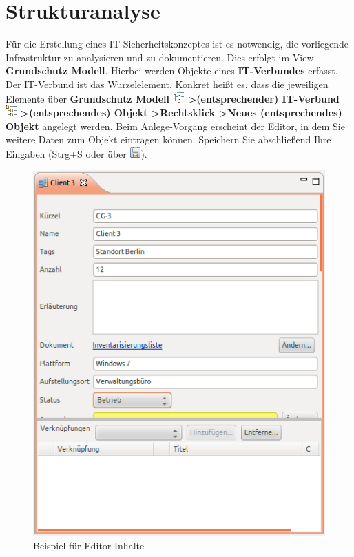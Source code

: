 \documentclass[a4paper,10pt]{book}
\begin{document}
\section{Strukturanalyse} \label{Strukturanalyse}
Für die Erstellung eines IT-Sicherheitskonzeptes ist es notwendig, die vorliegende Infrastruktur zu analysieren und zu dokumentieren. Dies erfolgt im View \textbf{Grundschutz Modell}. Hierbei werden Objekte eines \textbf{IT-Verbundes} erfasst. Der IT-Verbund ist das Wurzelelement. Konkret heißt es, dass die jeweiligen Elemente über \textbf{Grundschutz Modell \includegraphics[height=2ex]{Icon/GS_Modell.png} \textgreater (entsprechender) IT-Verbund \includegraphics[height=2ex]{Icon/GS_Modell.png} \textgreater (entsprechendes) Objekt \textgreater Rechtsklick \textgreater Neues (entsprechendes) Objekt} angelegt werden. Beim Anlege-Vorgang erscheint der Editor, in dem Sie weitere Daten zum Objekt eintragen können. Speichern Sie abschließend Ihre Eingaben (Strg+S oder über \includegraphics[height=2ex]{Icon/Disk.png}).
\newline
\begin{figure}[htb!]
  \centering
  \includegraphics[scale=.65]{Screenshot/Editor-View_GS.png}
  \caption{\label{Beispiel fuer Editor-Inhalte} Beispiel für Editor-Inhalte}
\end{figure}
\end{document}
